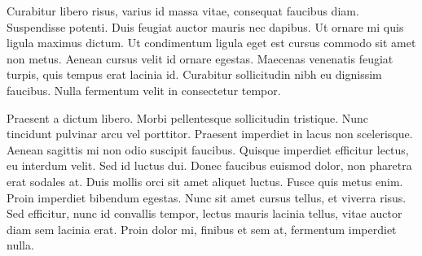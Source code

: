 	Curabitur libero risus, varius id massa vitae, consequat faucibus diam. Suspendisse potenti. Duis feugiat auctor mauris nec dapibus. Ut ornare mi quis ligula maximus dictum. Ut condimentum ligula eget est cursus commodo sit amet non metus. Aenean cursus velit id ornare egestas. Maecenas venenatis feugiat turpis, quis tempus erat lacinia id. Curabitur sollicitudin nibh eu dignissim faucibus. Nulla fermentum velit in consectetur tempor.

	Praesent a dictum libero. Morbi pellentesque sollicitudin tristique. Nunc tincidunt pulvinar arcu vel porttitor. Praesent imperdiet in lacus non scelerisque. Aenean sagittis mi non odio suscipit faucibus. Quisque imperdiet efficitur lectus, eu interdum velit. Sed id luctus dui. Donec faucibus euismod dolor, non pharetra erat sodales at. Duis mollis orci sit amet aliquet luctus. Fusce quis metus enim. Proin imperdiet bibendum egestas. Nunc sit amet cursus tellus, et viverra risus. Sed efficitur, nunc id convallis tempor, lectus mauris lacinia tellus, vitae auctor diam sem lacinia erat. Proin dolor mi, finibus et sem at, fermentum imperdiet nulla.
